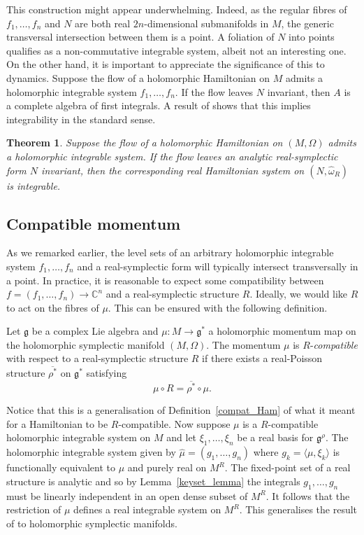 \documentclass[pdftex]{sigma}
\numberwithin{equation}{section}
\newtheorem{Theorem}{Theorem}[section]
\newcommand{\C}{\mathbb{C}}
\begin{document}
This construction might appear underwhelming. Indeed, as the regular fibres of $f_1,\dots,f_n$ and $N$ are both real $2n$-dimensional submanifolds in $M$, the generic transversal intersection between them is a point. A foliation of $N$ into points qualifies as a non-commutative integrable system, albeit not an interesting one. On the other hand, it is important to appreciate the significance of this to dynamics. Suppose the flow of a holomorphic Hamiltonian on $M$ admits a holomorphic integrable system $f_1,\dots,f_n$. If the flow leaves $N$ invariant, then ${A}$ is a complete algebra of first integrals. A result of \cite{bols} shows that this implies integrability in the standard sense.
\begin{Theorem}%
Suppose the flow of a holomorphic Hamiltonian on $(M,\Omega)$ admits a holomorphic integrable system. If the flow leaves an analytic real-symplectic form $N$ invariant, then the corresponding real Hamiltonian system on $(N,\widehat{\omega}_R)$ is integrable.
\end{Theorem}

\subsection{Compatible momentum}

As we remarked earlier, the level sets of an arbitrary holomorphic integrable system $f_1,\dots, f_n$ and a real-symplectic form will typically intersect transversally in a point. In practice, it is reasonable to expect some compatibility between $f=(f_1,\dots, f_n)\rightarrow\C^n$ and a real-symplectic structure $R$. Ideally, we would like $R$ to act on the fibres of $\mu$. This can be ensured with the following definition.
\begin{Definition}%
	Let $\mathfrak{g}$ be a complex Lie algebra and $\mu\colon M\rightarrow\mathfrak{g}^*$ a holomorphic momentum map on the holomorphic symplectic manifold $(M,\Omega)$. The momentum $\mu$ is $R$-\emph{compatible} with respect to a real-symplectic structure $R$ if there exists a real-Poisson structure $\overline{\rho^*}$ on $\mathfrak{g}^*$ satisfying
	\begin{equation}\label{compatiblemomentum}
		{\mu\circ R}=\overline{\rho^*}\circ\mu.
	\end{equation}
\end{Definition}
Notice that this is a generalisation of Definition~\ref{compat_Ham} of what it meant for a Hamiltonian to be $R$-compatible. Now suppose $\mu$ is a $R$-compatible holomorphic integrable system on $M$ and let $\xi_1,\dots, \xi_n$ be a real basis for $\mathfrak{g}^\rho$. The holomorphic integrable system given by $\widehat{\mu}=(g_1,\dots, g_n)$ where $g_k=\langle\mu,\xi_k\rangle$ is functionally equivalent to $\mu$ and purely real on $M^R$. The fixed-point set of a real structure is analytic \cite{analyticfix} and so by Lemma~\ref{keyset_lemma} the integrals $g_1,\dots,g_n$ must be linearly independent in an open dense subset of $M^R$. It follows that the restriction of $\mu$ defines a real integrable system on $M^R$. This generalises the result of \cite{bulgarian1} to holomorphic symplectic manifolds.
\end{document}
